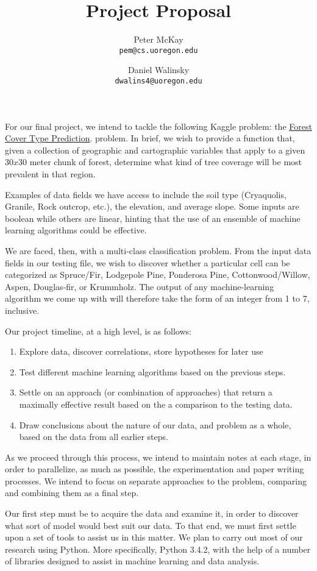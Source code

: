 \documentclass[10pt,a4paper]{article}
\author{
  Peter McKay\\
  \texttt{pem@cs.uoregon.edu}
  \and
  Daniel Walinsky\\
  \texttt{dwalins4@uoregon.edu}
}
\title{Project Proposal}
\begin{document}
\maketitle

For our final project, we intend to tackle the following Kaggle problem:
the 
\href{http://www.kaggle.com/c/forest-cover-type-prediction}{Forest Cover Type Prediction}.
problem. In brief, we wish to provide a function that, given a collection 
of geographic and cartographic variables that apply to a given $30 x 30$ 
meter chunk of forest, determine what kind of tree coverage will be most 
prevalent in that region.

Examples of data fields we have access to include the soil type 
(Cryaquolis, Granile, Rock outcrop, etc.), the elevation, and average slope.
Some inputs are boolean while others are linear, hinting that the use
of an ensemble of machine learning algorithms could be effective.

We are faced, then, with a multi-class classification problem. From the input 
data fields in our testing file, we wish to discover whether a 
particular cell can be categorized as
Spruce/Fir,
Lodgepole Pine,
Ponderosa Pine,
Cottonwood/Willow,
Aspen,
Douglas-fir, or
Krummholz.
The output of any machine-learning algorithm we come up with will 
therefore take the form of an integer from 1 to 7, inclusive.

Our project timeline, at a high level, is as follows:
\begin{enumerate}
\item Explore data, discover correlations, store hypotheses for later 
  use
\item Test different machine learning algorithms based on the previous 
  steps.
\item Settle on an approach (or combination of approaches) that return 
  a maximally effective result based on the a comparison to the testing 
  data.
\item Draw conclusions about the nature of our data, and problem as a 
  whole, based on the data from all earlier steps.
\end{enumerate}

As we proceed through this process, we intend to maintain notes at each 
stage, in order to parallelize, as much as possible, the experimentation 
and paper writing processes. We intend to focus on separate approaches 
to the problem, comparing and combining them as a final step.

Our first step must be to acquire the data and examine it, in order to 
discover what sort of model would best suit our data.  To that end, we 
must first settle upon a set of tools to assist us in this matter.  
We plan to carry out most of our research using Python.  More 
specifically, Python 3.4.2, with the help of a number of libraries 
designed to assist in machine learning and data analysis.  
\end{document}
